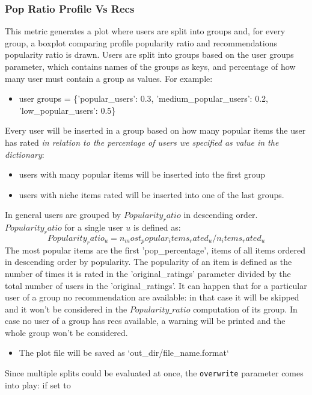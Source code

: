 \documentclass[11pt]{article}
\begin{document}
\subsubsection{Pop Ratio Profile Vs Recs}\label{subsubsec:popratio}
This metric generates a plot where users are split into groups and, for every group, a boxplot comparing
profile popularity ratio and recommendations popularity ratio is drawn.
Users are split into groups based on the user groups parameter, which contains names of the groups as keys,
and percentage of how many user must contain a group as values.
For example:
\begin{itemize}
       \item user groups = \{'popular\_users': 0.3, 'medium\_popular\_users': 0.2, 'low\_popular\_users': 0.5\}
\end{itemize}
\hfill\break
\hfill\break
Every user will be inserted in a group based on how many popular items the user has rated
\textit{in relation to the percentage of users we specified as value in the dictionary}:
\begin{itemize}
    \item users with many popular items will be inserted into the first group
    \item users with niche items rated will be inserted into one of the last groups.
\end{itemize}
\hfill\break
\hfill\break
In general users are grouped by $Popularity_ratio$ in descending order. $Popularity_ratio$ for a single user $u$
is defined as:
\hfill\break
\hfill\break
    \[
        Popularity_ratio_u = n_most_popular_items_rated_u / n_items_rated_u
    \]
\hfill\break
\hfill\break
The most popular items are the first 'pop\_percentage', items of all items ordered in descending order by
popularity.
The popularity of an item is defined as the number of times it is rated in the 'original\_ratings' parameter
divided by the total number of users in the 'original\_ratings'.
It can happen that for a particular user of a group no recommendation are available: in that case it will be skipped
and it won't be considered in the $Popularity\_ratio$ computation of its group. In case no user of a group has recs
available, a warning will be printed and the whole group won't be considered.
\begin{itemize}
    \item The plot file will be saved as `out\_dir/file\_name.format`
\end{itemize}
\hfill\break
\hfill\break
Since multiple splits could be evaluated at once, the \texttt{overwrite} parameter comes into play: if set to
\end{document}
